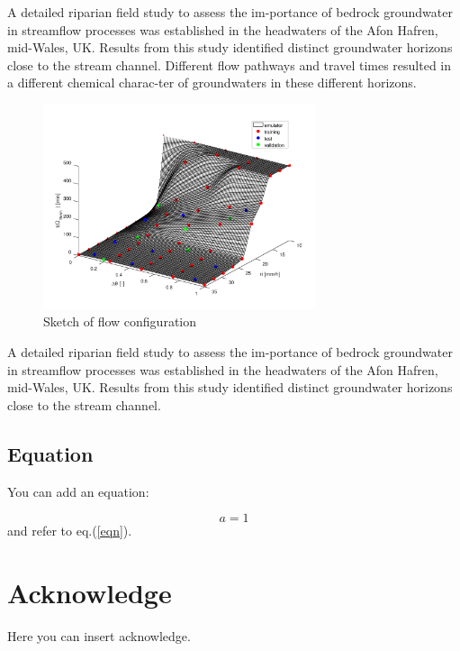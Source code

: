 \documentclass[12pt,a4paper,twocolumn,fleqn]{narms}
\begin{document}
A detailed riparian field study to assess the im-portance of
bedrock groundwater in streamflow processes was established in the
headwaters of the Afon Hafren, mid-Wales, UK.  Results from this
study identified distinct groundwater horizons close to the stream
channel.  Different flow pathways and travel times resulted in a
different chemical charac-ter of groundwaters in these different
horizons.


\begin{figure}[h!]
\centerline{
\includegraphics[width=8cm]{img/emulator.png}
} \caption{Sketch of flow configuration} \label{f:sketch1}
\end{figure}


A detailed riparian field study to assess the im-portance of
bedrock groundwater in streamflow processes was established in the
headwaters of the Afon Hafren, mid-Wales, UK.  Results from this
study identified distinct groundwater horizons close to the stream
channel.


\begin{table}
\caption{Margin settings for A4 size paper and letter size paper.}
\end{table}

\subsection{Equation}

You can add an equation:

\begin{equation}\label{eqn}
  a=1
\end{equation}
and refer to eq.(\ref{eqn}).

\section{Acknowledge}

Here you can insert acknowledge.



\end{document}
